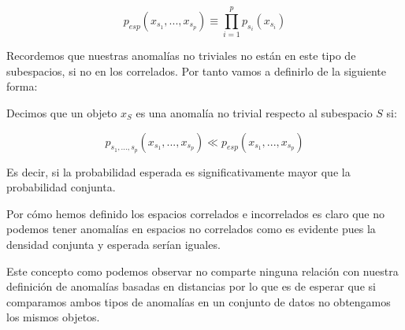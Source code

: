 $$p_{esp}(x_{s_1} , ... , x_{s_p}) \equiv \prod_{i=1}^{p}p_{s_i}(x_{s_i})$$

Recordemos que nuestras anomalías no triviales no están en este tipo de subespacios, si no en los correlados. Por tanto vamos a definirlo de la siguiente forma:

\begin{definicion}
	Decimos que un objeto $x_{S}$ es una anomalía no trivial respecto al subespacio $S$ si:
	
	$$p_{s_1 , ... , s_p}(x_{s_1} , ... , x_{s_p}) \ll p_{esp}(x_{s_1} , ... , x_{s_p})$$
	
	Es decir, si la probabilidad esperada es significativamente mayor que la probabilidad conjunta.
\end{definicion}

Por cómo hemos definido los espacios correlados e incorrelados es claro que no podemos tener anomalías en espacios no correlados como es evidente pues la densidad conjunta y esperada serían iguales.

Este concepto como podemos observar no comparte ninguna relación con nuestra definición de anomalías basadas en distancias por lo que es de esperar que si comparamos ambos tipos de anomalías en un conjunto de datos no obtengamos los mismos objetos.